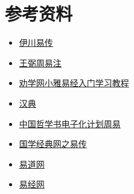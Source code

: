 \documentclass[12pt,oneside]{book}
\begin{document}
\chapter{参考资料}
\begin{itemize}
\item \href{https://www.eee-learning.com/article/897}{伊川易传}
\item \href{http://www.quanxue.cn/QT_MingXiang/ZhouYiZhuIndex.html}{王弼周易注}
\item \href{http://www.quanxue.cn/QT_XiaoYa/YiJingIndex.html}{劝学网小雅易经入门学习教程}
\item \href{https://www.zdic.net/}{汉典}
\item \href{https://ctext.org/book-of-changes/zhs}{中国哲学书电子化计划周易}
\item \href{http://vsucai.cn/yizhuan/index.html}{国学经典网之易传}
\item \href{http://baike.yidao5.com/}{易道网}
\item \href{http://www.xshiqi.com/}{易经网}

\end{itemize}








\end{document}
